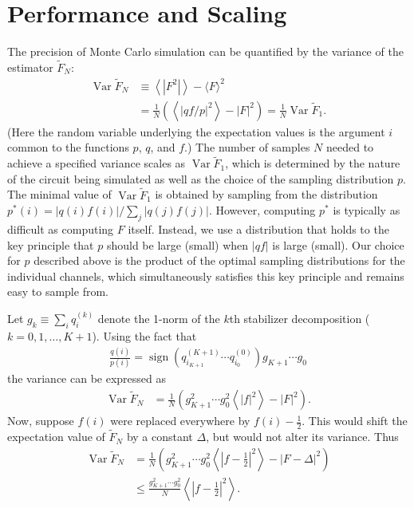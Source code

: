 \documentclass[twocolumn,pra]{revtex4}
\begin{document}
\section{Performance and Scaling} 
\label{sec:perf}
The precision of Monte Carlo simulation can be quantified by the variance of the estimator $\tilde{F}_N$:
\begin{align}
\operatorname{Var}\tilde{F}_{N} &\equiv \left\langle |F^2| \right\rangle - {\langle F \rangle}^2 \\
&= \frac{1}{N} \left(\left< \left| q f/p\right|^{2} \right> - \left|F\right|^{2}\right) = \frac{1}{N} \operatorname{Var}\tilde{F}_{1}.
\end{align}
(Here the random variable underlying the expectation values is the argument $i$ common to the functions $p$, $q$, and $f$.) The number of samples $N$ needed to achieve a specified variance scales as $\operatorname{Var}\tilde{F}_{1}$, which
is determined by the nature of the circuit being simulated as well as the choice of the sampling distribution $p$.
The minimal value of $\operatorname{Var}\tilde{F}_{1}$ is obtained by sampling from the distribution $p^{*}(i)=\left| q(i) f(i)\right| / \sum_{j}\left|  q(j) f(j)\right|$.
However, computing $p^{*}$ is typically as difficult as computing $F$ itself.
Instead, we use a distribution that holds to the key principle that $p$ should be large (small) when $| q f|$ is large (small). 
Our choice for $p$ described above is the product of the optimal sampling distributions for the individual channels, which simultaneously satisfies this key principle and remains easy to sample from.
\par
Let $g_{k} \equiv \sum_i q^{(k)}_i$ denote the 1-norm of the $k$th stabilizer decomposition ($k=0,1,\ldots,K+1$). Using the fact that
\begin{gather}
\frac{  q(i) }{ p(i) } = \operatorname{sign} \left(  q_{i_{K+1}}^{(K+1)} \cdots  q_{i_{0}}^{(0)}\right) g_{K+1} \cdots g_{0}
\end{gather}
the variance can be expressed as
\begin{align}
\label{eq:var}
\operatorname{Var}\tilde{F}_{N} &=\frac{1}{N}\left( g_{K+1}^2 \cdots g_{0}^2 \left< \left|f \right|^{2} \right> - \left| F\right|^{2}\right).
\end{align}
Now, suppose $f(i)$ were replaced everywhere by $f(i)-\frac{1}{2}$. This would shift the expectation value of $\tilde{F}_N$ by a constant $\Delta$, but would not alter its variance. Thus
\begin{align}
\operatorname{Var}\tilde{F}_N &= \frac{1}{N}\left( g_{K+1}^2 \cdots g_{0}^2  \left< \left|f - \textstyle\frac{1}{2} \right|^{2} \right> - \left| F - \Delta \right|^{2}\right) \\
 &\le \frac{ g_{K+1}^2 \cdots g_{0}^2 }{N}   \left< \left|f - \textstyle\frac{1}{2} \right|^{2} \right>.
\end{align}
\end{document}

